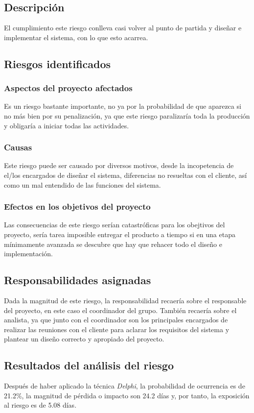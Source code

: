 \documentclass[11pt,a4paper,spanish,twoside]{report}
\begin{document}
\subsection{Descripción}
El cumplimiento este riesgo conlleva casi volver al punto de partida y
diseñar e implementar el sistema, con lo que esto acarrea.
\subsection{Riesgos identificados}
\subsubsection{Aspectos del proyecto afectados}
Es un riesgo bastante importante, no ya por la probabilidad de que aparezca
si no más bien por su penalización, ya que este riesgo paralizaría toda la
producción y obligaría a iniciar todas las actividades.
\subsubsection{Causas}
Este riesgo puede ser causado por diversos motivos, desde la incopetencia de
el/los encargados de diseñar el sistema, diferencias no resueltas con el
cliente, así como un mal entendido de las funciones del sistema.
\subsubsection{Efectos en los objetivos del proyecto}
Las consecuencias de este riesgo serían catastróficas para los obejtivos del
proyecto, sería tarea imposible entregar el producto a tiempo si en una etapa
mínimamente avanzada se descubre que hay que rehacer todo el diseño e
implementación. 
\subsection{Responsabilidades asignadas}
Dada la magnitud de este riesgo, la responsabilidad recaería sobre el
responsable del proyecto, en este caso el coordinador del grupo. También
recaería sobre el analista, ya que junto con el coordinador son los
principales encargados de realizar las reuniones con el cliente para aclarar
los requisitos del sistema y plantear un diseño correcto y apropiado del
proyecto.
\subsection{Resultados del análisis del riesgo}
Después de haber aplicado la técnica \emph{Delphi}, la probabilidad de
ocurrencia es de 21.2\%, la magnitud de pérdida o impacto son 24.2 días y, por
tanto, la exposición al riesgo es de 5.08 días.
\end{document}
